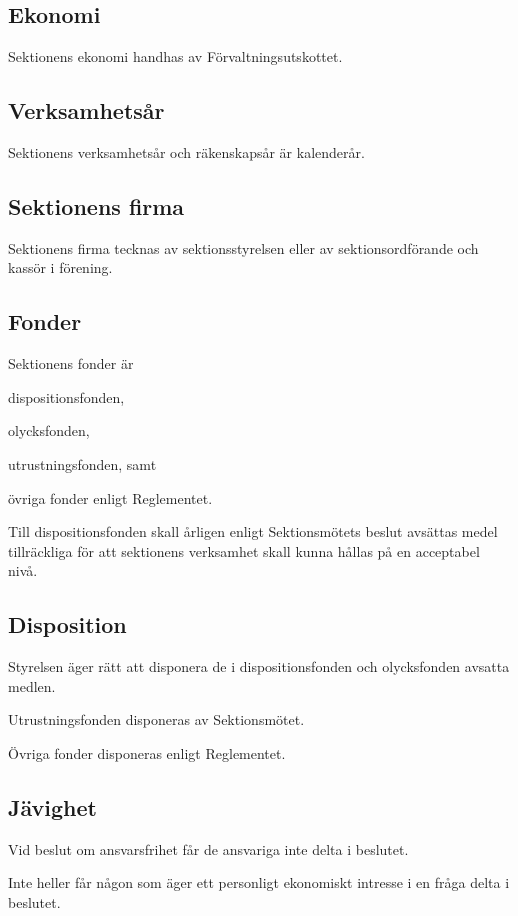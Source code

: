 \documentclass[10pt]{article}
\begin{document}
\subsection{Ekonomi}
Sektionens ekonomi handhas av Förvaltningsutskottet.

\subsection{Verksamhetsår}
Sektionens verksamhetsår och räkenskapsår är kalenderår.

\subsection{Sektionens firma}
Sektionens firma tecknas av sektionsstyrelsen eller av sektionsordförande och kassör i förening.

\subsection{Fonder}
Sektionens fonder är
\begin{alphlist}
\item dispositionsfonden,
\item olycksfonden,
\item utrustningsfonden, samt
\item övriga fonder enligt Reglementet.
\end{alphlist}

Till dispositionsfonden skall årligen enligt Sektionsmötets beslut avsättas
medel tillräckliga för att sektionens verksamhet skall kunna hållas på en
acceptabel nivå.

\subsection{Disposition}
Styrelsen äger rätt att disponera de i dispositionsfonden och olycksfonden
avsatta medlen.

Utrustningsfonden disponeras av Sektionsmötet.

Övriga fonder disponeras enligt Reglementet.

\subsection{Jävighet}
Vid beslut om ansvarsfrihet får de ansvariga inte delta i beslutet.

Inte heller får någon som äger ett personligt ekonomiskt intresse i en
fråga delta i beslutet.
\newpage
\end{document}
